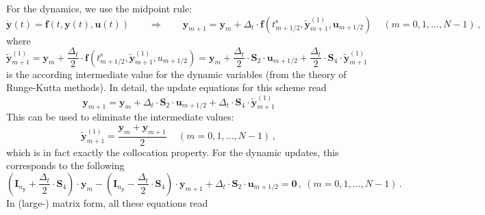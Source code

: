\documentclass{article}
\newcommand{\vectorfont}[1]{\boldsymbol{#1}}%
\newcommand{\greekvectorfont}[1]{\boldsymbol{#1}}%
\newcommand{\matrixfont}[1]{\mathbf{#1}}%
\newcommand{\fvec}{\vectorfont{f}}
\newcommand{\uvec}{\vectorfont{u}}
\newcommand{\yvec}{\vectorfont{y}}
\newcommand{\tildeyvec}{\vectorfont{\tilde{y}}}
\newcommand{\dyvec}{\vectorfont{\dot{y}}}
\newcommand{\nullvec}{\greekvectorfont{0}}
\newcommand{\Imat}{\matrixfont{I}}%
\newcommand{\Smat}{\matrixfont{S}}
\begin{document}
For the dynamics, we use the midpoint rule:
\[
\dyvec(t) = \fvec(t, \yvec(t), \uvec(t))\qquad\Rightarrow\qquad
\yvec_{m+1} = \yvec_{m} + \Delta_t \cdot \fvec(t_{m+1/2}^{\mathrm{s}}, \tildeyvec_{m+1}^{(1)}, \uvec_{m+1/2})\,\quad (m=0,1,\ldots,N-1)\,,
\]
where 
\[%
\tildeyvec_{m+1}^{(1)} %
= \yvec_m + \frac{\Delta_t}{2} \cdot \fvec (t_{m+1/2}^{\mathrm{s}} , \tildeyvec_{m+1}^{(1)}, u_{m+1/2})
= \yvec_m + \frac{\Delta_t}{2} \cdot \Smat_2 \cdot \uvec_{m+1/2} + \frac{\Delta_t}{2} \cdot \Smat_4 \cdot \tildeyvec_{m+1}^{(1)}
\]%
is the according intermediate value for the dynamic variables (from the theory of Runge-Kutta methods).
In detail, the update equations for this scheme read
\[
\yvec_{m+1} = \yvec_m + \Delta_t \cdot \Smat_2 \cdot \uvec_{m+1/2} + \Delta_t \cdot \Smat_4 \cdot \tildeyvec_{m+1}^{(1)}
\]
This can be used to eliminate the intermediate values:
\[
\tildeyvec_{m+1}^{(1)} = \frac{\yvec_m + \yvec_{m+1}}{2}\,\quad (m=0,1,\ldots, N-1)\,,
\]
which is in fact exactly the collocation property.
%
For the dynamic updates, this corresponds to the following
\[
\left(\Imat_{n_{\yvec}} + \frac{\Delta_t}{2} \cdot \Smat_4 \right) \cdot \yvec_m - \left(\Imat_{n_{\yvec}}- \frac{\Delta_t}{2}\cdot \Smat_4 \right)\cdot\yvec_{m+1} + \Delta_t \cdot \Smat_2 \cdot \uvec_{m+1/2} = \nullvec\,,~(m = 0,1,\ldots,N-1)\,.
\]
In (large-) matrix form, all these equations read
\end{document}
